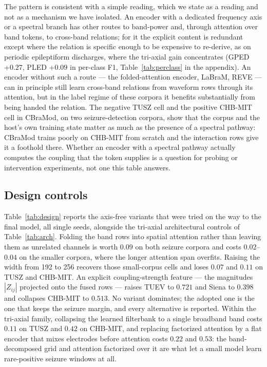 The pattern is consistent with a simple reading, which we state as a
reading and not as a mechanism we have isolated. An encoder with a
dedicated frequency axis or a spectral branch has other routes to
band-power and, through attention over band tokens, to cross-band
relations; for it the explicit content is redundant except where the
relation is specific enough to be expensive to re-derive, as on
periodic epileptiform discharges, where the tri-axial gain concentrates
(GPED $+0.27$, PLED $+0.09$ in per-class F1,
Table~\ref{tab:perclass} in the appendix). An encoder without such a
route --- the folded-attention encoder, LaBraM, REVE --- can in
principle still learn cross-band relations from waveform rows through
its attention, but in the label regime of these corpora it benefits
substantially from being handed the relation. The negative TUSZ cell and
the positive CHB-MIT cell in CBraMod, on two seizure-detection corpora,
show that the corpus and the host's own training state matter as much
as the presence of a spectral pathway: CBraMod trains poorly on CHB-MIT
from scratch and the interaction rows give it a foothold there. Whether
an encoder with a spectral pathway actually computes the coupling that
the token supplies is a question for probing or intervention
experiments, not one this table answers.

\subsection{Design controls}
\label{sec:design}

Table~\ref{tab:design} reports the axis-free variants that were tried on
the way to the final model, all single seeds, alongside the tri-axial
architectural controls of Table~\ref{tab:arch}. Folding the band rows
into spatial attention rather than leaving them as unrelated channels is
worth $0.09$ on both seizure corpora and costs $0.02$--$0.04$ on the
smaller corpora, where the longer attention span overfits. Raising the
width from 192 to 256 recovers those small-corpus cells and loses
$0.07$ and $0.11$ on TUSZ and CHB-MIT. An explicit coupling-strength
feature --- the magnitudes $|Z_{ij}|$ projected onto the fused rows ---
raises TUEV to $0.721$ and Siena to $0.398$ and collapses CHB-MIT to
$0.513$. No variant dominates; the adopted one is the one that keeps the
seizure margin, and every alternative is reported. Within the tri-axial
family, collapsing the learned filterbank to a single broadband band
costs $0.11$ on TUSZ and $0.42$ on CHB-MIT, and replacing factorized
attention by a flat encoder that mixes electrodes before attention costs
$0.22$ and $0.53$: the band-decomposed grid and attention factorized over
it are what let a small model learn rare-positive seizure windows at all.

